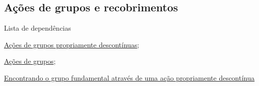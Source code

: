 \subsection{Ações de grupos e recobrimentos}
\label{ações-de-grupos-e-recobrimentos-ex}
\begin{titlemize}{Lista de dependências}
	\item \hyperref[ações-de-gr-propriamente-descontínuas-def]{Ações de grupos propriamente descontínuas};\\ %
	\item \hyperref[ações-de-grupos-def]{Ações de grupos};\\
    \item \hyperref[ações-de-grupos-e-gr-fundamental-prop]{Encontrando o grupo fundamental através de uma ação propriamente descontínua}
\end{titlemize}


